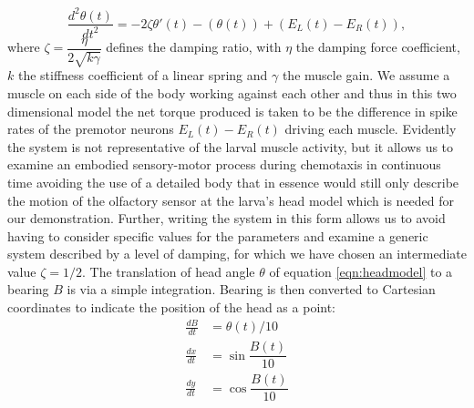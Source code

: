 \documentclass[11pt,a4paper]{article}
\begin{document}
\begin{equation}
\label{eqn:headmodel}
\frac{d^2\theta(t)}{dt^2} = - 2 \zeta \theta'(t) - (\theta(t)) + (E_L(t) - E_R(t)),
\end{equation}
where $\zeta= \dfrac{\eta}{ 2\sqrt{k \gamma}}$ defines the damping ratio, with $\eta$ the damping force coefficient, $k$ the stiffness coefficient of a linear spring and $\gamma$ the muscle gain.
We assume a muscle on each side of the body working against each other and thus in this two dimensional model the net torque produced is taken to be the difference in spike rates of the premotor neurons $E_L(t) - E_R(t)$ driving each muscle. 
Evidently the system is not representative of the larval muscle activity, but it allows us to examine an embodied sensory-motor process during chemotaxis in continuous time avoiding the use of a detailed body that in essence would still only describe the motion of the olfactory sensor at the larva's head model which is needed for our demonstration.
 Further, writing the system in this form allows us to avoid having to consider specific values for the parameters and examine a generic system described by a level of damping, for which we have chosen an intermediate value $\zeta=1/2$.
The translation of head angle $\theta$ of equation \ref{eqn:headmodel} to a bearing $B$ is via a simple integration. Bearing is then converted to Cartesian coordinates to indicate the position of the head as a point:
\begin{align}
\frac{dB}{dt} &= \theta(t)/10 \\
\frac{dx}{dt} &= \sin{\dfrac{B(t)}{10}} \\
\frac{dy}{dt} &= \cos{\dfrac{B(t)}{10}}
\end{align}
   
\end{document}
